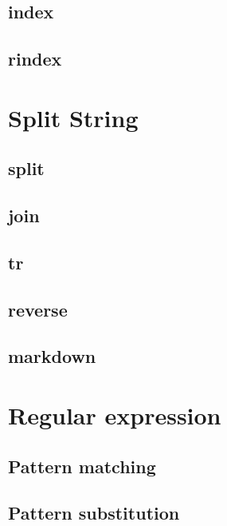 \documentclass[]{book}
\theoremstyle{definition}
\theoremstyle{definition}
\theoremstyle{definition}
\theoremstyle{remark}
\begin{document}
\subsection{index}\label{index}

\subsection{rindex}\label{rindex}

\section{Split String}\label{split-string-1}

\subsection{split}\label{split}

\subsection{join}\label{join}

\subsection{tr}\label{tr}

\subsection{reverse}\label{reverse}

\subsection{markdown}\label{markdown}

\section{Regular expression}\label{regular-expression-1}

\subsection{Pattern matching}\label{pattern-matching-1}

\subsection{Pattern substitution}\label{pattern-substitution-1}
\end{document}
